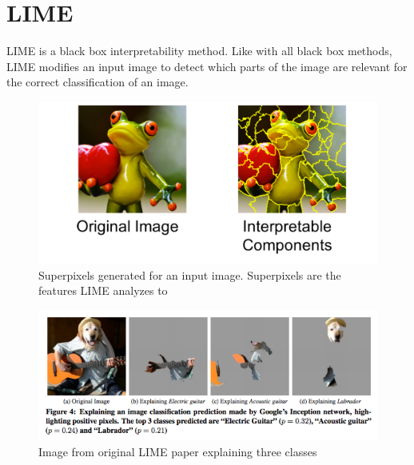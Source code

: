 \section{LIME}

LIME \cite{ribeiro2016should} is a black box interpretability method. Like with all black box methods, LIME modifies an input image to detect which parts of the image are relevant for the correct classification of an image. 



\begin{figure}[H]
\centering
\includegraphics[width=14cm]{chapters/02_methods/images/lime.jpg}
\caption{Superpixels generated for an input image. Superpixels are the features LIME analyzes to }
\end{figure}



\begin{figure}[H]
\centering
\includegraphics[width=14cm]{chapters/02_methods/images/lime.png}
\caption{Image from original LIME paper explaining three classes}
\end{figure}
